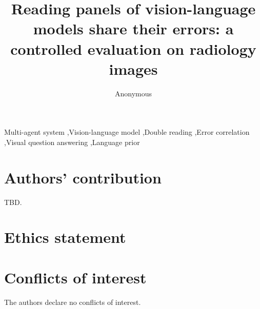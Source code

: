 \documentclass[preprint,12pt]{elsarticle}
\begin{document}
\begin{frontmatter}
\title{Reading panels of vision-language models share their errors: a controlled evaluation on radiology images}
\author{Anonymous}
\begin{abstract}

\end{abstract}
\begin{keyword}
Multi-agent system \sep Vision-language model \sep Double reading \sep Error correlation \sep Visual question answering \sep Language prior
\end{keyword}
\end{frontmatter}







\section*{Authors' contribution}
TBD.

\section*{Ethics statement}


\section*{Conflicts of interest}
The authors declare no conflicts of interest.



\end{document}
